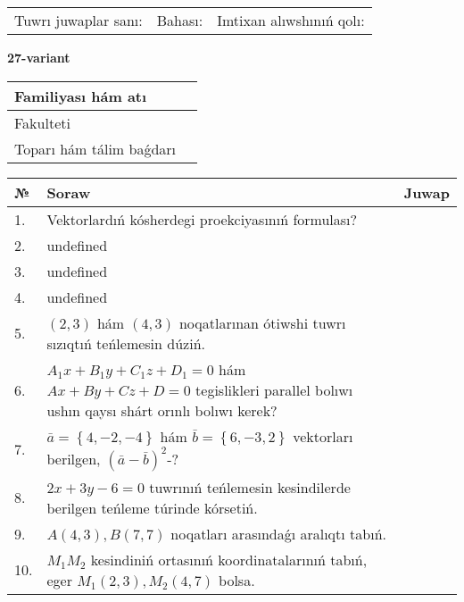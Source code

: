 \documentclass{article}
\begin{document}
\vspace{0.7cm}

\begin{tabular}{lll}
Tuwrı juwaplar sanı: \underline{\hspace{1cm}} & 
Bahası: \underline{\hspace{1cm}} & 
Imtixan alıwshınıń qolı: \underline{\hspace{2cm}} \\
\end{tabular}

\egroup

\newpage


\textbf{27-variant}\\

\bgroup
\def\arraystretch{1.6} %

\begin{tabular}{|m{5.7cm}|m{9.5cm}|}
\hline
Familiyası hám atı & \\
\hline
Fakulteti  & \\
\hline
Toparı hám tálim baǵdarı  & \\
\hline
\end{tabular}

\vspace{0.7cm}

\begin{tabular}{|m{0.7cm}|m{10cm}|m{4cm}|}
\hline
№ & Soraw & Juwap \\
\hline
1. & Vektorlardıń kósherdegi proekciyasınıń formulası? &  \\
\hline
2. & undefined &  \\
\hline
3. & undefined &  \\
\hline
4. & undefined &  \\
\hline
5. & $(2, 3)$ hám $(4, 3)$ noqatlarınan ótiwshi tuwrı sızıqtıń teńlemesin dúziń. &  \\
\hline
6. & \(A_{1}x + B_{1}y + C_{1}z + D_{1} = 0\) hám \(Ax + By + Cz + D = 0\) tegislikleri parallel bolıwı ushın qaysı shárt orınlı bolıwı kerek? &  \\
\hline
7. & \(\bar{a} = \left\{ 4,- 2,- 4 \right\}\) hám \(\bar{b} = \left\{ 6,- 3, 2 \right\}\) vektorları berilgen, \((\bar{a} - \bar{b}) ^{2}\)-? &  \\
\hline
8. & \(2 x + 3 y - 6 = 0\) tuwrınıń teńlemesin kesindilerde berilgen teńleme túrinde kórsetiń. &  \\
\hline
9. & \(A (4, 3), B (7, 7)\) noqatları arasındaǵı aralıqtı tabıń. &  \\
\hline
10. & \(M_{1}M_{2}\) kesindiniń ortasınıń koordinatalarınıń tabıń, eger \(M_{1} (2, 3), M_{2} (4, 7)\) bolsa. & \\
\hline
\end{tabular}
\end{document}
